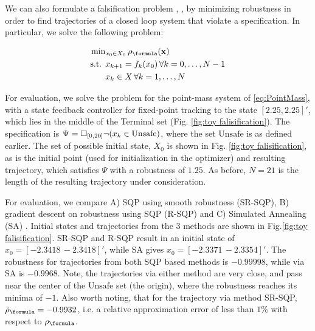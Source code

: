 We can also formulate a falsification problem \cite{AbbasATVA11_LinFalsification}, \cite{AbbasF_HybridSA12}, \cite{Deshmukh15_IterativeApproaches} by minimizing robustness in order to find trajectories of a closed loop system that violate a specification. In particular, we solve the following problem:

\begin{subequations}
\vspace{-20pt}
\label{eq:falsification}
\begin{align}
\text{min}&_{x_0 \in X_0 } \, \rob_{\formula}(\sstraj) \nonumber \\
\text{s.t. } & x_{k+1} = f_k(x_0) \, \forall k=0,\dotsc,N-1 \\
&  x_{k} \in X \, \forall k=1,\dotsc,N
\end{align}
\end{subequations}

For evaluation, we solve the problem for the point-mass system of \eqref{eq:PointMass}, with a state feedback controller for fixed-point tracking to the state $[2.25,2.25]'$, which lies in the middle of the Terminal set (Fig. \ref{fig:toy falisification}). The specification is $\Psi=\square_{[0,20]} \neg (x_k \in \text{Unsafe})$, where the set $\text{Unsafe}$ is as defined earlier. The set of possible initial state, $X_0$ is shown in Fig. \ref{fig:toy falisification}, as is the initial point (used for initialization in the optimizer) and resulting trajectory, which satisfies $\Psi$ with a robustness of $1.25$. As before, $N=21$ is the length of the resulting trajectory under consideration.

For evaluation, we compare A) SQP using smooth robustness (SR-SQP), B) gradient descent on robustness using SQP (R-SQP) and C) Simulated Annealing (SA) \cite{SA_book}. Initial states and trajectories from the 3 methods are shown in Fig.\ref{fig:toy falisification}. SR-SQP and R-SQP result in an initial state of $x_0=[-2.3418\, -2.3418]'$, while SA gives $x_0=[-2.3371\, -2.3354]'$. The robustness for trajectories from both SQP based methods is $-0.99998$, while via SA is $-0.9968$. Note, the trajectories via either method are very close, and pass near the center of the $\text{Unsafe}$ set (the origin), where the robustness reaches its minima of $-1$. Also worth noting, that for the trajectory via method SR-SQP, $\srob_{\formula}=-0.9932$, i.e. a relative approximation error of less than $1\%$ with respect to $\rob_{\formula}$.

